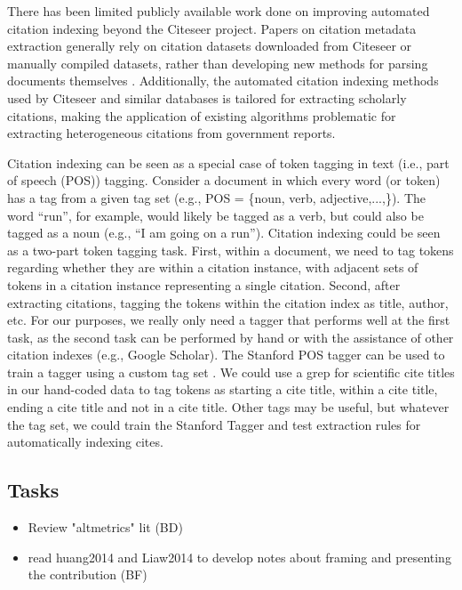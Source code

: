 \documentclass[12pt]{article}
\begin{document}
There has been limited publicly available work done on improving automated citation indexing beyond the Citeseer project. Papers on citation metadata extraction generally rely on citation datasets downloaded from Citeseer or manually compiled datasets, rather than developing new methods for parsing documents themselves \cite{anzaroot2013}. Additionally, the automated citation indexing methods used by Citeseer and similar databases is tailored for extracting scholarly citations, making the application of existing algorithms problematic for extracting heterogeneous citations from government reports.

Citation indexing can be seen as a special case of token tagging in text (i.e., part of speech (POS)) tagging. Consider a document in which every word (or token) has a tag from a given tag set (e.g., POS = \{noun, verb, adjective,...,\}). The word ``run'', for example, would likely be tagged as a verb, but could also be tagged as a noun (e.g., ``I am going on a run''). Citation indexing could be seen as a two-part token tagging task. First, within a document, we need to tag tokens regarding whether they are within a citation instance, with adjacent sets of tokens in a citation instance representing a single citation. Second, after extracting citations, tagging the tokens within the citation index as title, author, etc. For our purposes, we really only need a tagger that performs well at the first task, as the second task can be performed by hand or with the assistance of other citation indexes (e.g., Google Scholar). The Stanford POS tagger can be used to train a tagger using a custom tag set \cite{toutanova2003}. We could use a grep for scientific cite titles in our hand-coded data to tag tokens as starting a cite title, within a cite title, ending a cite title and not in a cite title. Other tags may be useful, but whatever the tag set, we could train the Stanford Tagger and test extraction rules for automatically indexing cites.  


\subsection{Tasks}

\begin{itemize}
\item Review "altmetrics" lit (BD)
\item  read huang2014 and Liaw2014 to develop notes about framing and presenting the contribution (BF)

\end{itemize}
\end{document}
